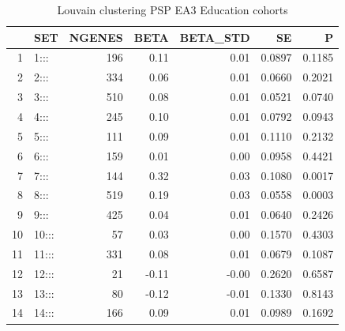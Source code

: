 \begin{table}[ht]
\centering
\begin{tabular}{rlrrrrr}
  \hline
 & SET & NGENES & BETA & BETA\_STD & SE & P \\ 
  \hline
1 & 1::: & 196 & 0.11 & 0.01 & 0.0897 & 0.1185 \\ 
  2 & 2::: & 334 & 0.06 & 0.01 & 0.0660 & 0.2021 \\ 
  3 & 3::: & 510 & 0.08 & 0.01 & 0.0521 & 0.0740 \\ 
  4 & 4::: & 245 & 0.10 & 0.01 & 0.0792 & 0.0943 \\ 
  5 & 5::: & 111 & 0.09 & 0.01 & 0.1110 & 0.2132 \\ 
  6 & 6::: & 159 & 0.01 & 0.00 & 0.0958 & 0.4421 \\ 
  7 & 7::: & 144 & 0.32 & 0.03 & 0.1080 & 0.0017 \\ 
  8 & 8::: & 519 & 0.19 & 0.03 & 0.0558 & 0.0003 \\ 
  9 & 9::: & 425 & 0.04 & 0.01 & 0.0640 & 0.2426 \\ 
  10 & 10::: & 57 & 0.03 & 0.00 & 0.1570 & 0.4303 \\ 
  11 & 11::: & 331 & 0.08 & 0.01 & 0.0679 & 0.1087 \\ 
  12 & 12::: & 21 & -0.11 & -0.00 & 0.2620 & 0.6587 \\ 
  13 & 13::: & 80 & -0.12 & -0.01 & 0.1330 & 0.8143 \\ 
  14 & 14::: & 166 & 0.09 & 0.01 & 0.0989 & 0.1692 \\ 
   \hline
\end{tabular}
\caption{Louvain clustering PSP EA3 Education cohorts}
\label{tab:Louvain clustering EA3 Education cohorts}
\end{table}










